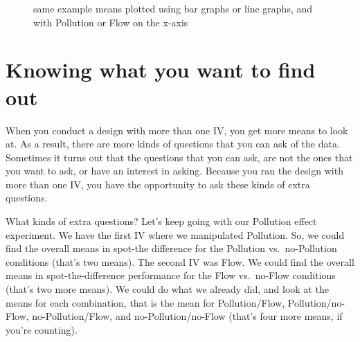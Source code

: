 \documentclass[
  letterpaper,
  DIV=11,
  numbers=noendperiod]{scrreprt}
\begin{document}
\begin{figure}


\caption{\label{fig-10visualdiffs}same example means plotted using bar
graphs or line graphs, and with Pollution or Flow on the x-axis}

\end{figure}%

\section{Knowing what you want to find
out}\label{knowing-what-you-want-to-find-out}

When you conduct a design with more than one IV, you get more means to
look at. As a result, there are more kinds of questions that you can ask
of the data. Sometimes it turns out that the questions that you can ask,
are not the ones that you want to ask, or have an interest in asking.
Because you ran the design with more than one IV, you have the
opportunity to ask these kinds of extra questions.

What kinds of extra questions? Let's keep going with our Pollution
effect experiment. We have the first IV where we manipulated Pollution.
So, we could find the overall means in spot-the difference for the
Pollution vs.~no-Pollution conditions (that's two means). The second IV
was Flow. We could find the overall means in spot-the-difference
performance for the Flow vs.~no-Flow conditions (that's two more means).
We could do what we already did, and look at the means for each
combination, that is the mean for Pollution/Flow, Pollution/no-Flow,
no-Pollution/Flow, and no-Pollution/no-Flow (that's four more means, if
you're counting).
\end{document}
